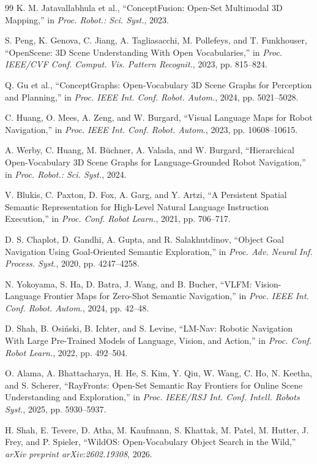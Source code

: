 \documentclass[letterpaper,10pt,conference]{ieeeconf}
\begin{document}
{\begin{thebibliography}{99}
K. M. Jatavallabhula et al.,
``ConceptFusion: Open-Set Multimodal 3D Mapping,'' in \emph{Proc. Robot.:
Sci. Syst.}, 2023.

S. Peng, K. Genova, C. Jiang, A. Tagliasacchi, M. Pollefeys, and
T. Funkhouser,
``OpenScene: 3D Scene Understanding With Open Vocabularies,'' in
\emph{Proc. IEEE/CVF Conf. Comput. Vis. Pattern Recognit.}, 2023,
pp. 815--824.

Q. Gu et al.,
``ConceptGraphs: Open-Vocabulary 3D Scene Graphs for Perception and
Planning,'' in \emph{Proc. IEEE Int. Conf. Robot. Autom.}, 2024,
pp. 5021--5028.

C. Huang, O. Mees, A. Zeng, and W. Burgard,
``Visual Language Maps for Robot Navigation,'' in \emph{Proc. IEEE Int.
Conf. Robot. Autom.}, 2023, pp. 10608--10615.

A. Werby, C. Huang, M. B\"uchner, A. Valada, and W. Burgard,
``Hierarchical Open-Vocabulary 3D Scene Graphs for Language-Grounded Robot
Navigation,'' in \emph{Proc. Robot.: Sci. Syst.}, 2024.

V. Blukis, C. Paxton, D. Fox, A. Garg, and Y. Artzi,
``A Persistent Spatial Semantic Representation for High-Level Natural
Language Instruction Execution,'' in \emph{Proc. Conf. Robot Learn.}, 2021,
pp. 706--717.

D. S. Chaplot, D. Gandhi, A. Gupta, and R. Salakhutdinov,
``Object Goal Navigation Using Goal-Oriented Semantic Exploration,'' in
\emph{Proc. Adv. Neural Inf. Process. Syst.}, 2020, pp. 4247--4258.

N. Yokoyama, S. Ha, D. Batra, J. Wang, and B. Bucher,
``VLFM: Vision-Language Frontier Maps for Zero-Shot Semantic Navigation,''
in \emph{Proc. IEEE Int. Conf. Robot. Autom.}, 2024, pp. 42--48.

D. Shah, B. Osi\'nski, B. Ichter, and S. Levine,
``LM-Nav: Robotic Navigation With Large Pre-Trained Models of Language,
Vision, and Action,'' in \emph{Proc. Conf. Robot Learn.}, 2022,
pp. 492--504.

O. Alama, A. Bhattacharya, H. He, S. Kim, Y. Qiu, W. Wang, C. Ho, N. Keetha,
and S. Scherer,
``RayFronts: Open-Set Semantic Ray Frontiers for Online Scene Understanding
and Exploration,'' in \emph{Proc. IEEE/RSJ Int. Conf. Intell. Robots Syst.},
2025, pp. 5930--5937.

H. Shah, E. Tevere, D. Atha, M. Kaufmann, S. Khattak, M. Patel, M. Hutter,
J. Frey, and P. Spieler,
``WildOS: Open-Vocabulary Object Search in the Wild,''
\emph{arXiv preprint arXiv:2602.19308}, 2026.


\end{thebibliography}}
\end{document}
